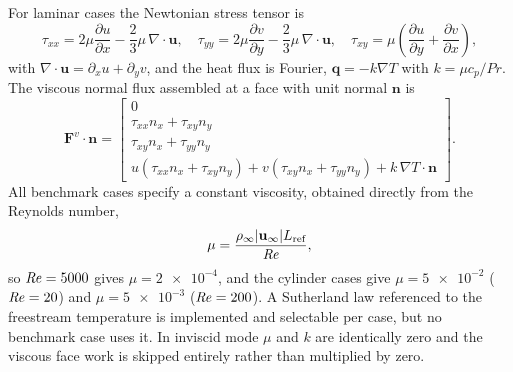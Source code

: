For laminar cases the Newtonian stress tensor is
\begin{equation}
  \tau_{xx}=2\mu\frac{\partial u}{\partial x}-\frac{2}{3}\mu\,\nabla\!\cdot\!\mathbf{u},
  \quad
  \tau_{yy}=2\mu\frac{\partial v}{\partial y}-\frac{2}{3}\mu\,\nabla\!\cdot\!\mathbf{u},
  \quad
  \tau_{xy}=\mu\left(\frac{\partial u}{\partial y}+\frac{\partial v}{\partial x}\right),
  \label{eq:stress}
\end{equation}
with $\nabla\!\cdot\!\mathbf{u}=\partial_x u+\partial_y v$, and the heat flux is
Fourier, $\mathbf{q}=-k\nabla T$ with $k=\mu c_p/\mathit{Pr}$. The viscous
normal flux assembled at a face with unit normal $\mathbf{n}$ is
\begin{equation}
  \mathbf{F}^v\!\cdot\!\mathbf{n}=
  \begin{bmatrix}
    0\\
    \tau_{xx}n_x+\tau_{xy}n_y\\
    \tau_{xy}n_x+\tau_{yy}n_y\\
    u\left(\tau_{xx}n_x+\tau_{xy}n_y\right)+v\left(\tau_{xy}n_x+\tau_{yy}n_y\right)
      +k\,\nabla T\!\cdot\!\mathbf{n}
  \end{bmatrix}.
  \label{eq:viscflux}
\end{equation}
All benchmark cases specify a constant viscosity, obtained directly from the
Reynolds number,
\begin{equation}
  \mu=\frac{\rho_\infty |\mathbf{u}_\infty| L_{\text{ref}}}{\mathit{Re}},
  \label{eq:mu}
\end{equation}
so $\mathit{Re}=5000$ gives $\mu=\num{2e-4}$, and the cylinder cases give
$\mu=\num{5e-2}$ ($\mathit{Re}=20$) and $\mu=\num{5e-3}$ ($\mathit{Re}=200$). A
Sutherland law referenced to the freestream temperature is implemented and
selectable per case, but no benchmark case uses it. In inviscid mode $\mu$ and
$k$ are identically zero and the viscous face work is skipped entirely rather
than multiplied by zero.
